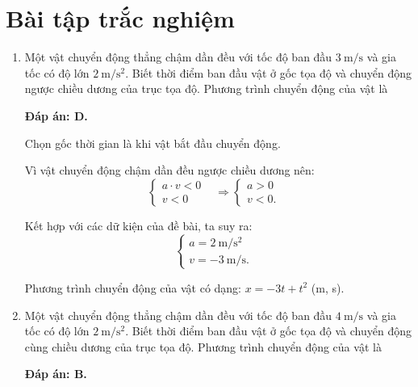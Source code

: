 \let\lesson\undefined
\newcommand{\lesson}{\phantomlesson{Bài 7.}}
\setcounter{section}{2}
\section{Bài tập trắc nghiệm}
\begin{enumerate}[label=\bfseries Câu \arabic*:]
	
	
		\item {}
	
	{Một vật chuyển động thẳng chậm dần đều với tốc độ ban đầu $\SI{3}{\meter/\second}$ và gia tốc có độ lớn $\SI{2}{\meter/\second^2}$. Biết thời điểm ban đầu vật ở gốc tọa độ và chuyển động ngược chiều dương của trục tọa độ. Phương trình chuyển động của vật là
	}
	\hideall
	{	\textbf{Đáp án: D.}
		
		Chọn gốc thời gian là khi vật bắt đầu chuyển động.
		
		Vì vật chuyển động chậm dần đều ngược chiều dương nên:
		\begin{equation*}
			\left\{\begin{array}{ll}{a\cdot v <0}&\\{v < 0}&\end{array}\right.\Rightarrow \left\{\begin{array}{ll}{a > 0}&\\{v < 0.}&\end{array}\right.
		\end{equation*}
		
		Kết hợp với các dữ kiện của đề bài, ta suy ra:
		\begin{equation*}
			\left\{\begin{array}{ll}{a=\SI{2}{\meter/\second^2}}&\\{v=\SI{-3}{\meter/\second} .}&\end{array}\right.
		\end{equation*}
		
		Phương trình chuyển động của vật có dạng:
		$x=-3t+t^2$ (m, s).
	}


	\item {}
	
	{ Một vật chuyển động thẳng chậm dần đều với tốc độ ban đầu $\SI{4}{\meter/\second}$ và gia tốc có độ lớn $\SI{2}{\meter/\second^2}$. Biết thời điểm ban đầu vật ở gốc tọa độ và chuyển động cùng chiều dương của trục tọa độ. Phương trình chuyển động của vật là
	}
	\hideall
	{	\textbf{Đáp án: B.}
		
}
\end{enumerate}
